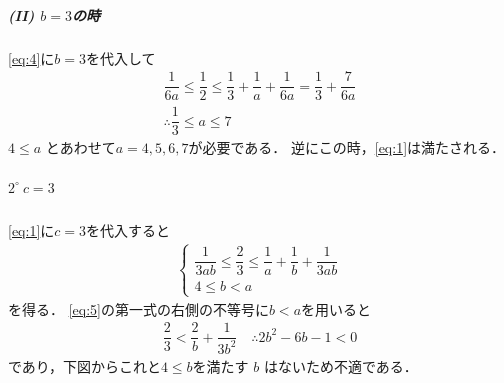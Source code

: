 \documentclass[../../main.tex]{subfiles}
\begin{document}
\subparagraph{(II) $b=3$の時}
\cref{eq:4}に$b=3$を代入して
\begin{align}
  \dfrac{1}{6a} \le \dfrac{1}{2} \le \dfrac{1}{3} + \dfrac{1}{a} + \dfrac{1}{6a} = \dfrac{1}{3} + \dfrac{7}{6a} \\
  \therefore
  \dfrac{1}{3} \le a \le 7
\end{align}
$4 \le a$ とあわせて$a=4, 5, 6, 7$が必要である．
逆にこの時，\cref{eq:1}は満たされる．

\subparagraph{$2^\circ \ c=3$}
\cref{eq:1}に$c=3$を代入すると
\begin{align}
  \begin{cases}
    \dfrac{1}{3ab} \le \dfrac{2}{3} \le \dfrac{1}{a} + \dfrac{1}{b} + \dfrac{1}{3ab} \\
    4 \le b < a
  \end{cases} \label{eq:5}
\end{align}
を得る．
\cref{eq:5}の第一式の右側の不等号に$b<a$を用いると
\begin{align}
  \dfrac{2}{3} < \dfrac{2}{b} + \dfrac{1}{3b^2} \quad \therefore 2b^2 - 6b - 1 < 0
\end{align}
であり，下図からこれと$4 \le b$を満たす $b$ はないため不適である．
\end{document}
